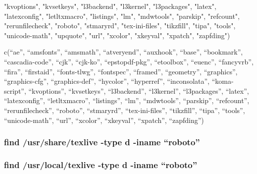 \documentclass[
]{article}
\newenvironment{Shaded}{\begin{snugshade}}{\end{snugshade}}
\newcommand{\NormalTok}[1]{#1}
\newcommand{\StringTok}[1]{\textcolor[rgb]{0.31,0.60,0.02}{#1}}
\begin{document}
\begin{Shaded}
\begin{Highlighting}[]
\StringTok{"kvoptions"}\NormalTok{, }\StringTok{"kvsetkeys"}\NormalTok{, }\StringTok{"l3backend"}\NormalTok{, }\StringTok{"l3kernel"}\NormalTok{, }\StringTok{"l3packages"}\NormalTok{, }
\StringTok{"latex"}\NormalTok{, }\StringTok{"latexconfig"}\NormalTok{, }\StringTok{"letltxmacro"}\NormalTok{, }\StringTok{"listings"}\NormalTok{, }\StringTok{"lm"}\NormalTok{, }\StringTok{"mdwtools"}\NormalTok{, }
\StringTok{"parskip"}\NormalTok{, }\StringTok{"refcount"}\NormalTok{, }\StringTok{"rerunfilecheck"}\NormalTok{, }\StringTok{"roboto"}\NormalTok{, }\StringTok{"stmaryrd"}\NormalTok{, }
\StringTok{"tex{-}ini{-}files"}\NormalTok{, }\StringTok{"tikzfill"}\NormalTok{, }\StringTok{"tipa"}\NormalTok{, }\StringTok{"tools"}\NormalTok{, }\StringTok{"unicode{-}math"}\NormalTok{, }
\StringTok{"upquote"}\NormalTok{, }\StringTok{"url"}\NormalTok{, }\StringTok{"xcolor"}\NormalTok{, }\StringTok{"xkeyval"}\NormalTok{, }\StringTok{"xpatch"}\NormalTok{, }\StringTok{"zapfding"}\NormalTok{)}
\end{Highlighting}
\end{Shaded}

c(``ae'', ``amsfonts'', ``amsmath'', ``atveryend'', ``auxhook'',
``base'', ``bookmark'', ``cascadia-code'', ``cjk'', ``cjk-ko'',
``epstopdf-pkg'', ``etoolbox'', ``euenc'', ``fancyvrb'', ``fira'',
``firstaid'', ``fonts-tlwg'', ``fontspec'', ``framed'', ``geometry'',
``graphics'', ``graphics-cfg'', ``graphics-def'', ``hycolor'',
``hyperref'', ``inconsolata'', ``koma-script'', ``kvoptions'',
``kvsetkeys'', ``l3backend'', ``l3kernel'', ``l3packages'', ``latex'',
``latexconfig'', ``letltxmacro'', ``listings'', ``lm'', ``mdwtools'',
``parskip'', ``refcount'', ``rerunfilecheck'', ``roboto'', ``stmaryrd'',
``tex-ini-files'', ``tikzfill'', ``tipa'', ``tools'', ``unicode-math'',
``url'', ``xcolor'', ``xkeyval'', ``xpatch'', ``zapfding'')

\hypertarget{find-usrsharetexlive--type-d--iname-roboto}{%
\subsubsection{find /usr/share/texlive -type d -iname
``roboto''}\label{find-usrsharetexlive--type-d--iname-roboto}}

\hypertarget{find-usrlocaltexlive--type-d--iname-roboto}{%
\subsubsection{find /usr/local/texlive -type d -iname
``roboto''}\label{find-usrlocaltexlive--type-d--iname-roboto}}
\end{document}
